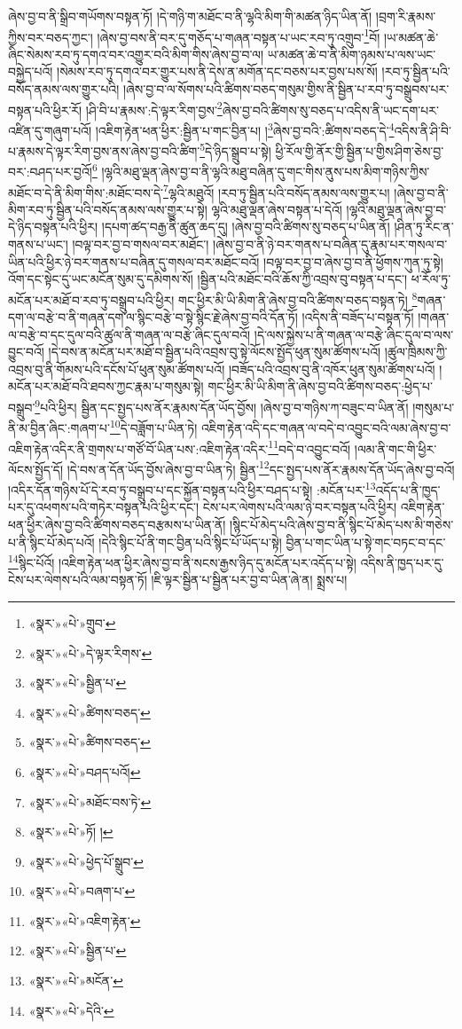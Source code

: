 ཞེས་བྱ་བ་ནི་སྒྲིབ་གཡོགས་བསྟན་ཏོ། །དེ་གཉི་ག་མཐོང་བ་ནི་ལྷའི་མིག་གི་མཚན་ཉིད་ཡིན་ནོ། །བྲག་རི་རྣམས་ཀྱིས་བར་བཅད་ཀྱང་། །ཞེས་བྱ་བས་ནི་བར་དུ་གཅོད་པ་གཞན་བསྟན་པ་ཡང་རབ་ཏུ་འགྲུབ་\footnote{«སྣར་»«པེ་»གྲུབ་}བོ། །ཡ་མཚན་ཆེ་ཞིང་སེམས་རབ་ཏུ་དགའ་བར་འགྱུར་བའི་མིག་གིས་ཞེས་བྱ་བ་ལ། ཡ་མཚན་ཆེ་བ་ནི་མིག་ཉམས་པ་ལས་ཡང་བསྐྱེད་པའོ། །སེམས་རབ་ཏུ་དགའ་བར་གྱུར་པས་ནི་དེས་ན་མགོན་དང་བཅས་པར་བྱས་པས་སོ། །རབ་ཏུ་སྦྱིན་པའི་བསོད་ནམས་ལས་གྱུར་པའི། །ཞེས་བྱ་བ་ལ་སོགས་པའི་ཚིགས་བཅད་གསུམ་གྱིས་ནི་སྦྱིན་པ་རབ་ཏུ་བསྒྲུབས་པར་བསྟན་པའི་ཕྱིར་རོ། །ཤི་བི་པ་རྣམས་:དེ་ལྟར་རིག་བྱས་\footnote{«སྣར་»«པེ་»དེ་ལྟར་རིགས་}ཞེས་བྱ་བའི་ཚིགས་སུ་བཅད་པ་འདིས་ནི་ཡང་དག་པར་འཛིན་དུ་གཞུག་པའོ། །འཇིག་རྟེན་ཕན་ཕྱིར་:སྦྱིན་པ་གང་བྱིན་པ། །\footnote{«སྣར་»«པེ་»སྦྱིན་པ་}ཞེས་བྱ་བའི་:ཚིགས་བཅད་དེ་\footnote{«སྣར་»«པེ་»ཚིགས་བཅད་}འདིས་ནི་ཤི་བི་པ་རྣམས་དེ་ལྟར་རིག་བྱས་ནས་ཞེས་བྱ་བའི་ཚིག་\footnote{«སྣར་»«པེ་»ཚིགས་བཅད་}དེ་ཉིད་སྒྲུབ་པ་སྟེ། ཕྱི་རོལ་གྱི་ནོར་གྱི་སྦྱིན་པ་གྱིས་ཤིག་ཅེས་བྱ་བར་:བཤད་པར་བྱའོ།\footnote{«སྣར་»«པེ་»བཤད་པའོ།} །ལྷའི་མཐུ་ལྡན་ཞེས་བྱ་བ་ནི་ལྷའི་མཐུ་བཞིན་དུ་གང་གིས་ནུས་པས་མིག་གཉིས་ཀྱིས་མཐོང་བ་དེ་ནི་མིག་གིས་:མཐོང་བས་དེ་\footnote{«སྣར་»«པེ་»མཐོང་བས་ཏེ་}ལྷའི་མཐུའོ། །རབ་ཏུ་སྦྱིན་པའི་བསོད་ནམས་ལས་གྱུར་པ། །ཞེས་བྱ་བ་ནི་མིག་རབ་ཏུ་སྦྱིན་པའི་བསོད་ནམས་ལས་གྱུར་པ་སྟེ། ལྷའི་མཐུ་ལྡན་ཞེས་བསྟན་པ་དེའོ། །ལྷའི་མཐུ་ལྡན་ཞེས་བྱ་བ་དེ་ཉིད་བསྟན་པའི་ཕྱིར། །དཔག་ཚད་བརྒྱ་ནི་ཚུན་ཆད་དུ། །ཞེས་བྱ་བའི་ཚིགས་སུ་བཅད་པ་ཡིན་ནོ། །ཤིན་ཏུ་རིང་ན་གནས་པ་ཡང་། །བལྟ་བར་བྱ་བ་གསལ་བར་མཐོང་། །ཞེས་བྱ་བ་ནི་ཉེ་བར་གནས་པ་བཞིན་དུ་རྣམ་པར་གསལ་བ་ཡིན་པའི་ཕྱིར་ཉེ་བར་གནས་པ་བཞིན་དུ་གསལ་བར་མཐོང་བའོ། །བལྟ་བར་བྱ་བ་ཞེས་བྱ་བ་ནི་ཕྱོགས་ཀུན་ཏུ་སྟེ། འོག་དང་སྟེང་དུ་ཡང་མངོན་སུམ་དུ་དམིགས་སོ། །སྦྱིན་པའི་མཐོང་བའི་ཆོས་ཀྱི་འབྲས་བུ་བསྟན་པ་དང་། ཕ་རོལ་ཏུ་མངོན་པར་མཐོ་བ་རབ་ཏུ་བསྒྲུབ་པའི་ཕྱིར། གང་ཕྱིར་མི་ཡི་མིག་ནི་ཞེས་བྱ་བའི་ཚིགས་བཅད་བསྟན་ཏེ། \footnote{«སྣར་»«པེ་»ཏོ། ། }གཞན་དག་ལ་བརྩེ་བ་ནི་གཞན་དག་ལ་སྙིང་བརྩེ་བ་སྟེ་སྙིང་རྗེ་ཞེས་བྱ་བའི་དོན་ཏོ། །འདིས་ནི་བཟོད་པ་བསྟན་ཏོ། །གཞན་ལ་བརྩེ་བ་དང་དུལ་བའི་ཚུལ་ནི་གཞན་ལ་བརྩེ་ཞིང་དུལ་བའོ། །དེ་ལས་སྐྱེས་པ་ནི་གཞན་ལ་བརྩེ་ཞིང་དུལ་བ་ལས་བྱུང་བའོ། །དེ་བས་ན་མངོན་པར་མཐོ་བ་སྦྱིན་པའི་འབྲས་བུ་སྟེ་ལོངས་སྤྱོད་ཕུན་སུམ་ཚོགས་པའོ། །ཚུལ་ཁྲིམས་ཀྱི་འབྲས་བུ་ནི་གོམས་པའི་དངོས་པོ་ཕུན་སུམ་ཚོགས་པའོ། །བཟོད་པའི་འབྲས་བུ་ནི་འཁོར་ཕུན་སུམ་ཚོགས་པའོ། །མངོན་པར་མཐོ་བའི་ཐབས་ཀྱང་རྣམ་པ་གསུམ་སྟེ། གང་ཕྱིར་མི་ཡི་མིག་ནི་ཞེས་བྱ་བའི་ཚིགས་བཅད་:ཕྱེད་པ་བསྒྲུབ་\footnote{«སྣར་»«པེ་»ཕྱེད་པོ་སྒྲུབ་}པའི་ཕྱིར། སྦྱིན་དང་སྤྱད་པས་ནོར་རྣམས་དོན་ཡོད་བྱོས། །ཞེས་བྱ་བ་གཉིས་ཀ་བཟུང་བ་ཡིན་ནོ། །གསུམ་པ་ནི་མ་བྱིན་ཞིང་:གཞག་པ་\footnote{«སྣར་»«པེ་»བཞག་པ་}དེ་བཟློག་པ་ཡིན་ཏེ། འཇིག་རྟེན་འདི་དང་གཞན་ལ་བདེ་བ་འབྱུང་བའི་ལམ་ཞེས་བྱ་བ་འཇིག་རྟེན་འདིར་ནི་གྲགས་པ་གཙོ་བོ་ཡིན་པས་:འཇིག་རྟེན་འདིར་\footnote{«སྣར་»«པེ་»འཇིག་རྟེན་}བདེ་བ་འབྱུང་བའོ། །ལམ་ནི་གང་གི་ཕྱིར་ལོངས་སྤྱོད་དོ། །དེ་བས་ན་དོན་ཡོད་བྱོས་ཞེས་བྱ་བ་ཡིན་ཏེ། སྦྱིན་\footnote{«སྣར་»«པེ་»སྦྱིན་པ་}དང་སྤྱད་པས་ནོར་རྣམས་དོན་ཡོད་ཞེས་བྱ་བའོ། །འདིར་དོན་གཉིས་པོ་དེ་རབ་ཏུ་བསྒྲུབ་པ་དང་སྐྱོན་བསྟན་པའི་ཕྱིར་བཤད་པ་སྟེ། :མངོན་པར་\footnote{«སྣར་»«པེ་»མངོན་}འདོད་པ་ནི་ཁྱད་པར་དུ་འཕགས་པའི་གཏེར་བསྟན་པའི་ཕྱིར་དང་། ངེས་པར་ལེགས་པའི་ལམ་ཉེ་བར་བསྟན་པའི་ཕྱིར། འཇིག་རྟེན་ཕན་ཕྱིར་ཞེས་བྱ་བའི་ཚིགས་བཅད་བརྩམས་པ་ཡིན་ནོ། །སྙིང་པོ་མེད་པའི་ཞེས་བྱ་བ་ནི་སྙིང་པོ་མེད་པས་མི་གཅེས་པ་ནི་སྙིང་པོ་མེད་པའོ། །དེའི་སྙིང་པོ་ནི་གང་བྱིན་པའི་སྙིང་པོ་ཡོད་པ་སྟེ། བྱིན་པ་གང་ཡིན་པ་སྟེ་གང་བཏང་བ་དང་\footnote{«སྣར་»«པེ་»དེའི་}སྙིང་པོའོ། །འཇིག་རྟེན་ཕན་ཕྱིར་ཞེས་བྱ་བ་ནི་སངས་རྒྱས་ཉིད་དུ་མངོན་པར་འདོད་པ་སྟེ། འདིས་ནི་ཁྱད་པར་དུ་ངེས་པར་ལེགས་པའི་ལམ་བསྟན་ཏོ། །ཇི་ལྟར་སྦྱིན་པ་སྦྱིན་པར་བྱ་བ་ཡིན་ཞེ་ན། སྨྲས་པ། 